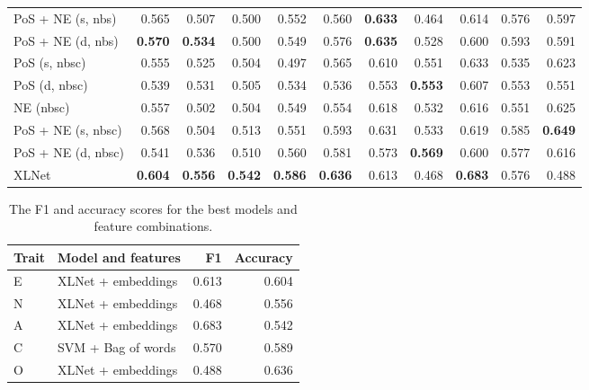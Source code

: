 \documentclass[10pt, a4paper]{article}
\begin{document}
\begin{table}
\begin{center}
\begin{tabular}{lrrrrrrrrrr}
     PoS + NE (s, nbs) & 0.565          & 0.507          & 0.500          & 0.552          & 0.560          & \textbf{0.633} & 0.464          & 0.614          & 0.576          &  0.597\\
     PoS + NE (d, nbs) & \textbf{0.570} & \textbf{0.534} & 0.500          & 0.549          & 0.576          & \textbf{0.635} & 0.528          & 0.600          & 0.593          &  0.591\\
         PoS (s, nbsc) & 0.555          & 0.525          & 0.504          & 0.497          & 0.565          & 0.610          & 0.551          & 0.633          & 0.535          &  0.623\\
         PoS (d, nbsc) & 0.539          & 0.531          & 0.505          & 0.534          & 0.536          & 0.553          & \textbf{0.553} & 0.607          & 0.553          &  0.551\\
             NE (nbsc) & 0.557          & 0.502          & 0.504          & 0.549          & 0.554          & 0.618          & 0.532          & 0.616          & 0.551          &  0.625\\
    PoS + NE (s, nbsc) & 0.568          & 0.504          & 0.513          & 0.551          & 0.593          & 0.631          & 0.533          & 0.619          & 0.585          &  \textbf{0.649}\\
    PoS + NE (d, nbsc) & 0.541          & 0.536          & 0.510          & 0.560          & 0.581          & 0.573          & \textbf{0.569} & 0.600          & 0.577          &  0.616\\
                 XLNet & \textbf{0.604} & \textbf{0.556} & \textbf{0.542} & \textbf{0.586} & \textbf{0.636} & 0.613          & 0.468          & \textbf{0.683} & 0.576          &  0.488\\
    \bottomrule
  \end{tabular}
  \end{center}
  \label{table:acc-f1}
\end{table}

\begin{table}[H]
  \centering
  \caption{The F1 and accuracy scores for the best models and feature combinations.}
  \begin{tabular}{llrr}
    \toprule
    Trait & Model and features &     F1 & Accuracy \\
    \midrule
    E &   XLNet + embeddings &  0.613 &  0.604 \\
    N &   XLNet + embeddings &  0.468 &  0.556 \\
    A &   XLNet + embeddings &  0.683 &  0.542 \\
    C &   SVM + Bag of words &  0.570 &  0.589 \\
    O &   XLNet + embeddings &  0.488 &  0.636 \\
    \bottomrule
  \end{tabular}
  \label{table:best}
\end{table}
\end{document}
